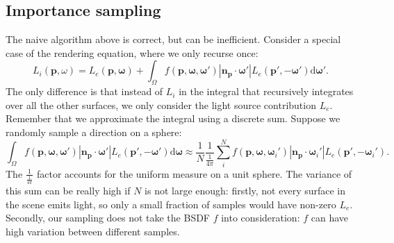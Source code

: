 \subsection{Importance sampling}
The naive algorithm above is correct, but can be inefficient. Consider a special case of the rendering equation, where we only recurse once:
\begin{equation}
    L_i(\mathbf{p}, \omega) = L_e(\mathbf{p}, \mathbf{\omega}) + \int_{\Omega} f(\mathbf{p}, \mathbf{\omega}, \mathbf{\omega}') |\mathbf{n}_{\mathbf{p}} \cdot \mathbf{\omega}'| L_e(\mathbf{p}', -\mathbf{\omega}') \mathrm{d} \mathbf{\omega}'.
\end{equation}
The only difference is that instead of $L_i$ in the integral that recursively integrates over all the other surfaces, we only consider the light source contribution $L_e$. Remember that we approximate the integral using a discrete sum. Suppose we randomly sample a direction on a sphere:
\begin{equation}
  \int_{\Omega} f(\mathbf{p}, \mathbf{\omega}, \mathbf{\omega}') |\mathbf{n}_{\mathbf{p}} \cdot \mathbf{\omega}'| L_e(\mathbf{p}', -\mathbf{\omega}') \mathrm{d} \mathbf{\omega} \approx \frac{1}{N} \frac{1}{\frac{1}{4 \pi}} \sum_{i}^{N} f(\mathbf{p}, \mathbf{\omega}, \mathbf{\omega}_i') |\mathbf{n}_{\mathbf{p}} \cdot \mathbf{\omega}_i'| L_e(\mathbf{p}', -\mathbf{\omega}_i').
\end{equation}
The $\frac{1}{\frac{1}{4\pi}}$ factor accounts for the uniform measure on a unit sphere. The variance of this sum can be really high if $N$ is not large enough: firstly, not every surface in the scene emits light, so only a small fraction of samples would have non-zero $L_e$. Secondly, our sampling does not take the BSDF $f$ into consideration: $f$ can have high variation between different samples.

